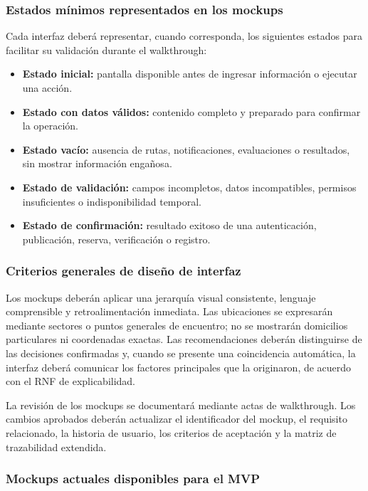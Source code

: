 \documentclass[12pt,a4paper]{article}
\begin{document}
\subsubsection{Estados mínimos representados en los mockups}

Cada interfaz deberá representar, cuando corresponda, los siguientes estados para facilitar su validación durante el walkthrough:

\begin{itemize}
  \item \textbf{Estado inicial:} pantalla disponible antes de ingresar información o ejecutar una acción.
  \item \textbf{Estado con datos válidos:} contenido completo y preparado para confirmar la operación.
  \item \textbf{Estado vacío:} ausencia de rutas, notificaciones, evaluaciones o resultados, sin mostrar información engañosa.
  \item \textbf{Estado de validación:} campos incompletos, datos incompatibles, permisos insuficientes o indisponibilidad temporal.
  \item \textbf{Estado de confirmación:} resultado exitoso de una autenticación, publicación, reserva, verificación o registro.
\end{itemize}

\subsubsection{Criterios generales de diseño de interfaz}

Los mockups deberán aplicar una jerarquía visual consistente, lenguaje comprensible y retroalimentación inmediata. Las ubicaciones se expresarán mediante sectores o puntos generales de encuentro; no se mostrarán domicilios particulares ni coordenadas exactas. Las recomendaciones deberán distinguirse de las decisiones confirmadas y, cuando se presente una coincidencia automática, la interfaz deberá comunicar los factores principales que la originaron, de acuerdo con el RNF de explicabilidad.

La revisión de los mockups se documentará mediante actas de walkthrough. Los cambios aprobados deberán actualizar el identificador del mockup, el requisito relacionado, la historia de usuario, los criterios de aceptación y la matriz de trazabilidad extendida.

\subsubsection{Mockups actuales disponibles para el MVP}
\end{document}
